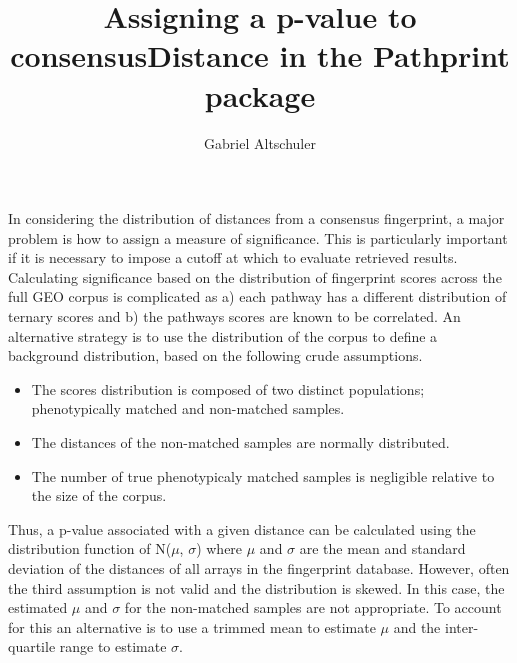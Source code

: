\documentclass{article}
\begin{document}
\title{Assigning a p-value to consensusDistance in the Pathprint package}
\author{Gabriel Altschuler}
\maketitle
In considering the distribution of distances from a consensus fingerprint, a major problem is how to assign a measure of significance. This is particularly important if it is necessary to impose a cutoff at which to evaluate retrieved results. Calculating significance based on the distribution of fingerprint scores across the full GEO corpus is complicated as a) each pathway has a different distribution of ternary scores and b) the pathways scores are known to be correlated. An alternative strategy is to use the distribution of the corpus to define a background distribution, based on the following crude assumptions.
\begin{itemize}
\item The scores distribution is composed of two distinct populations; phenotypically matched and non-matched samples.
\item The distances of the non-matched samples are normally distributed.
\item The number of true phenotypicaly matched samples is negligible relative to the size of the corpus.
\end{itemize}
Thus, a p-value associated with a given distance can be calculated using the distribution function of N($\mu$, $\sigma$) where $\mu$ and $\sigma$ are the mean and standard deviation of the distances of all arrays in the fingerprint database. However, often the third assumption is not valid and the distribution is skewed. In this case, the estimated $\mu$ and $\sigma$ for the non-matched samples are not appropriate. To account for this an alternative is to use a trimmed mean to estimate $\mu$ and the inter-quartile range to estimate $\sigma$.
\end{document}
